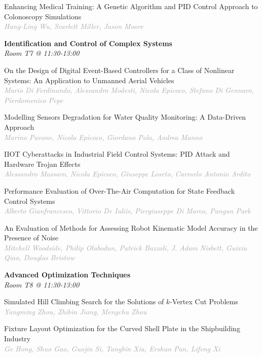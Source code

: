 \begin{multicols*}{2}
\small Enhancing Medical Training: A Genetic Algorithm and PID Control Approach to Colonoscopy Simulations\\ 
\footnotesize \textcolor{darkgray}{\textit{Hang-Ling Wu, Scarlett  Miller, Jason  Moore}}

\normalsize \textbf{Identification and Control of Complex Systems}\\
\small \textit{Room T7 @ 11:30-13:00}

\small On the Design of Digital Event-Based Controllers for a Class of Nonlinear Systems: An Application to Unmanned Aerial Vehicles\\ 
\footnotesize \textcolor{darkgray}{\textit{Mario Di Ferdinando, Alessandro  Modesti, Nicola  Epicoco, Stefano  Di Gennaro, Pierdomenico  Pepe}}

\small Modelling Sensors Degradation for Water Quality Monitoring: A Data-Driven Approach\\ 
\footnotesize \textcolor{darkgray}{\textit{Marino Pavone, Nicola  Epicoco, Giordano  Pola, Andrea  Manno}}

\small IIOT Cyberattacks in Industrial Field Control Systems: PID Attack and Hardware Trojan Effects\\ 
\footnotesize \textcolor{darkgray}{\textit{Alessandro Massaro, Nicola  Epicoco, Giuseppe  Loseto, Carmelo Antonio  Ardito}}

\small Performance Evaluation of Over-The-Air Computation for State Feedback Control Systems\\ 
\footnotesize \textcolor{darkgray}{\textit{Alberto Gianfrancesco, Vittorio  De Iuliis, Piergiuseppe  Di Marco, Pangun  Park}}

\small An Evaluation of Methods for Assessing Robot Kinematic Model Accuracy in the Presence of Noise\\ 
\footnotesize \textcolor{darkgray}{\textit{Mitchell Woodside, Philip  Olubodun, Patrick  Bazzoli, J. Adam  Nisbett, Guixiu  Qiao, Douglas  Bristow}}

\normalsize \textbf{Advanced Optimization Techniques}\\
\small \textit{Room T8 @ 11:30-13:00}

\small Simulated Hill Climbing Search for the Solutions of $k$-Vertex Cut Problems\\ 
\footnotesize \textcolor{darkgray}{\textit{Yangming Zhou, Zhibin  Jiang, Mengchu  Zhou}}

\small Fixture Layout Optimization for the Curved Shell Plate in the Shipbuilding Industry\\ 
\footnotesize \textcolor{darkgray}{\textit{Ge Hong, Shuo  Gao, Guojin  Si, Tangbin  Xia, Ershun  Pan, Lifeng  Xi}}


\end{multicols*}
